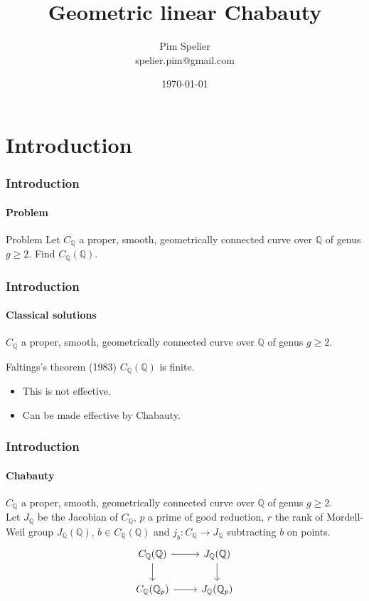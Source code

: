 \documentclass[15pt]{beamer}
\title[Geometric linear Chabauty]{Geometric linear Chabauty}
\author[Pim Spelier]{
  Pim Spelier\\\medskip
  {\small {spelier.pim@gmail.com}
  }}
\institute[Leiden University]{
  Mathematical Institute \\
  }
\date{\today}
\newcommand{\Q}{\mathbb{Q}}
\begin{document}
\begin{frame}
  \titlepage
\end{frame}


\section{Introduction}
\begin{frame}
    \frametitle{Introduction}
    \framesubtitle{Problem}
    \begin{block}{Problem}
        Let $C_\Q$ a proper, smooth, geometrically connected curve over $\Q$ of genus $g \geq 2$. Find $C_\Q(\Q)$.
    \end{block}
\end{frame}

\begin{frame}
    \frametitle{Introduction}
    \framesubtitle{Classical solutions}
    $C_\Q$ a proper, smooth, geometrically connected curve over $\Q$ of genus $g \geq 2$.
    \begin{block}{Faltings's theorem (1983)} 
        $C_\Q(\Q)$ is finite.
    \end{block}\pause
    \begin{itemize}[<+->]
	\item This is not effective.
	\item Can be made effective by Chabauty.
	\end{itemize}
\end{frame}

\begin{frame}
    \frametitle{Introduction}
    \framesubtitle{Chabauty}
    $C_\Q$ a proper, smooth, geometrically connected curve over $\Q$ of genus $g \geq 2$.\\
    Let $J_\Q$ be the Jacobian of $C_\Q$, $p$ a prime of good reduction, $r$ the rank of Mordell-Weil group $J_\Q(\Q)$, $b\in C_\Q(\Q)$ and $j_b: C_\Q \to J_\Q$ subtracting $b$ on points.\\ \pause
    \[
\begin{tikzcd}[ampersand replacement=\&]
C_\Q(\Q) \arrow[d] \arrow[r] \& J_\Q(\Q) \arrow[d] \\
C_\Q(\Q_p) \arrow[r]              \& J_\Q(\Q_p)        
\end{tikzcd}
\]
\vspace{50pt}
\end{frame}
\end{document}
